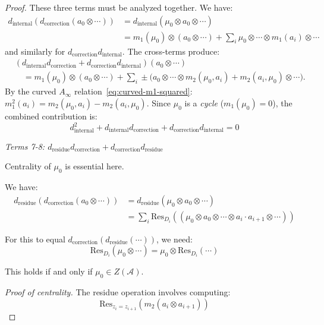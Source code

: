 \begin{proof}
These three terms must be analyzed together. We have:
\begin{align}
d_{\text{internal}}(d_{\text{correction}}(a_0 \otimes \cdots))
&= d_{\text{internal}}(\mu_0 \otimes a_0 \otimes \cdots) \\
&= m_1(\mu_0) \otimes (a_0 \otimes \cdots) + \sum_i \mu_0 \otimes \cdots \otimes m_1(a_i) \otimes \cdots
\end{align}
and similarly for $d_{\text{correction}} d_{\text{internal}}$. The cross-terms produce:
\begin{equation}
\begin{aligned}
&(d_{\text{internal}} d_{\text{correction}} + d_{\text{correction}} d_{\text{internal}})
(a_0 \otimes \cdots) \\
&\quad = m_1(\mu_0) \otimes (a_0 \otimes \cdots)
 + \sum_i \pm\bigl(
a_0 \otimes \cdots \otimes m_2(\mu_0, a_i)
 + m_2(a_i, \mu_0) \otimes \cdots
\bigr).
\end{aligned}
\end{equation}
By the curved $A_\infty$ relation~\eqref{eq:curved-m1-squared}: $m_1^2(a_i) = m_2(\mu_0, a_i) - m_2(a_i, \mu_0)$. Since $\mu_0$ is a \emph{cycle} ($m_1(\mu_0) = 0$), the combined contribution is:
\[d_{\text{internal}}^2 + d_{\text{internal}} d_{\text{correction}} + d_{\text{correction}} d_{\text{internal}} = 0\]

\emph{Terms 7-8: $d_{\text{residue}} d_{\text{correction}} + d_{\text{correction}} 
d_{\text{residue}}$}

Centrality of $\mu_0$ is essential here.

We have:
\begin{align}
d_{\text{residue}}(d_{\text{correction}}(a_0 \otimes \cdots)) 
&= d_{\text{residue}}(\mu_0 \otimes a_0 \otimes \cdots) \\
&= \sum_i \text{Res}_{D_i}((\mu_0 \otimes a_0 \otimes \cdots \otimes a_i \cdot a_{i+1} 
\otimes \cdots))
\end{align}

For this to equal $d_{\text{correction}}(d_{\text{residue}}(\cdots))$, we need:
\begin{equation}
\text{Res}_{D_i}(\mu_0 \otimes \cdots) = \mu_0 \otimes \text{Res}_{D_i}(\cdots)
\end{equation}

This holds if and only if $\mu_0 \in Z(\mathcal{A})$.

\emph{Proof of centrality.}
The residue operation involves computing:
\[\text{Res}_{z_i = z_{i+1}}(m_2(a_i \otimes a_{i+1}))\]


\end{proof}
